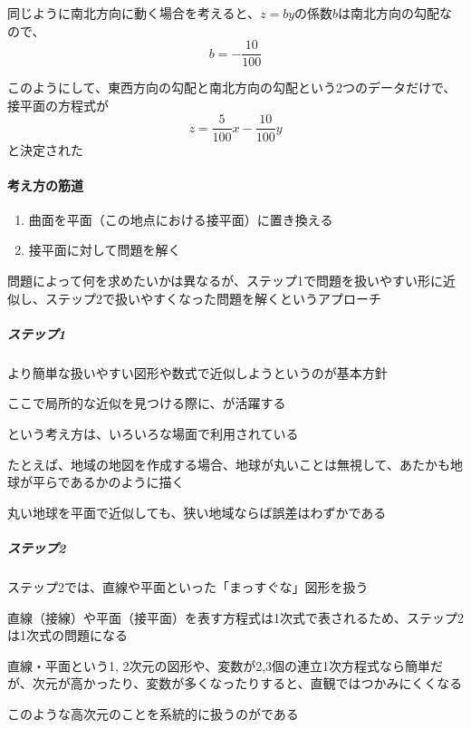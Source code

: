 \documentclass[../book_jiriki_calc]{subfiles}
\begin{document}
\br

同じように南北方向に動く場合を考えると、$z=by$の係数$b$は南北方向の勾配なので、
\begin{equation*}
  b = -\dfrac{10}{100}
\end{equation*}

\br

このようにして、東西方向の勾配と南北方向の勾配という2つのデータだけで、接平面の方程式が
\begin{equation*}
  z = \dfrac{5}{100}x - \dfrac{10}{100}y
\end{equation*}
と決定された

\sectionline

\paragraph{考え方の筋道}

\begin{enumerate}
  \item 曲面を平面（この地点における接平面）に置き換える
  \item 接平面に対して問題を解く
\end{enumerate}

\sectionline

問題によって何を求めたいかは異なるが、ステップ1で問題を扱いやすい形に近似し、ステップ2で扱いやすくなった問題を解くというアプローチ

\br

\subparagraph{ステップ1}\quad

より簡単な扱いやすい図形や数式で近似しようというのが基本方針

ここで局所的な近似を見つける際に、が活躍する

\br

という考え方は、いろいろな場面で利用されている

たとえば、地域の地図を作成する場合、地球が丸いことは無視して、あたかも地球が平らであるかのように描く

丸い地球を平面で近似しても、狭い地域ならば誤差はわずかである

\br

\subparagraph{ステップ2}\quad

ステップ2では、直線や平面といった「まっすぐな」図形を扱う

直線（接線）や平面（接平面）を表す方程式は1次式で表されるため、ステップ2は1次式の問題になる

\br

直線・平面という1, 2次元の図形や、変数が2,3個の連立1次方程式なら簡単だが、次元が高かったり、変数が多くなったりすると、直観ではつかみにくくなる

このような高次元のことを系統的に扱うのがである
\end{document}
